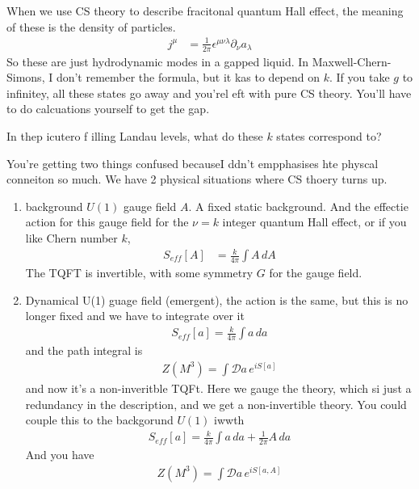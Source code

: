 When we use CS theory to describe fracitonal quantum Hall effect,
the meaning of these is the density of particles.
\begin{align}
    j^{\mu}
    &=
    \frac{1}{2\pi} \epsilon^{\mu\nu\lambda}
    \partial_\nu a_\lambda
\end{align}
So these are just hydrodynamic modes in a gapped liquid.
In Maxwell-Chern-Simons,
I don't remember the formula,
but it kas to depend on $k$.
If you take $g$ to infinitey,
all these states go away and you'rel eft with pure CS theory.
You'll have to do calcuations yourself to get the gap.

\begin{question}
In thep icutero f illing Landau levels,
what do these $k$ states correspond to?
\end{question}
You're getting two things confused
becauseI ddn't empphasises hte physcal conneiton so much.
We have 2 physical situations where CS thoery turns up.
\begin{enumerate}
 \item background $U(1)$ gauge field $A$.
     A fixed static background.
     And the effectie action for this gauge field for the $\nu=k$ integer
     quantum Hall effect,
     or if you like Chern number $k$,
     \begin{align}
         S_{eff}[A] &=
         \frac{k}{4\pi}
         \int A\, dA
     \end{align}
     The TQFT is invertible,
     with some symmetry $G$ for the gauge field.
 \item Dynamical U(1) guage field (emergent),
     the action is the same,
     but this is no longer fixed and we have to integrate over it
     \begin{align}
         S_{eff}[a] =
         \frac{k}{4\pi} \int a\, da
     \end{align}
     and the path integral is
     \begin{align}
         Z\left( M^3 \right)
         =
         \int \mathcal{D} a\,
         e^{iS[a]}
     \end{align}
     and now it's a non-inveritble TQFt.
     Here we gauge the theory,
     which si just a redundancy in the description,
     and we get a non-invertible theory.
     You could couple this to the backgorund $U(1)$ iwwth
     \begin{align}
         S_{eff}[a] =
         \frac{k}{4\pi} \int a\, da
         +
         \frac{1}{2\pi} A\, da
     \end{align}
     And you have
     \begin{align}
         Z\left( M^3 \right)
         =
         \int \mathcal{D} a\,
         e^{iS[a,A]}
     \end{align}
\end{enumerate}

